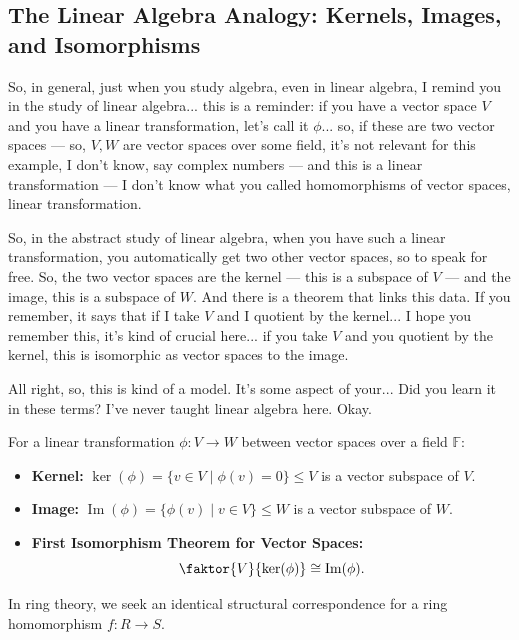 \subsection{The Linear Algebra Analogy: Kernels, Images, and Isomorphisms}

\begin{speech}[00:18:33 - 00:20:12]
So, in general, just when you study algebra, even in linear algebra, I remind you in the study of linear algebra...  this is a reminder: if you have a vector space $V$ and you have a linear transformation, let's call it $\phi$...  so, if these are two vector spaces --- so, $V, W$ are vector spaces over some field,  it's not relevant for this example, I don't know, say complex numbers --- and this is a linear transformation --- I don't know what you called homomorphisms of vector spaces, linear transformation. 

So, in the abstract study of linear algebra, when you have such a linear transformation, you automatically get two other vector spaces, so to speak for free. So, the two vector spaces are the kernel --- this is a subspace of $V$ --- and the image, this is a subspace of $W$.  And there is a theorem that links this data. If you remember, it says that if I take $V$ and I quotient by the kernel... I hope you remember this, it's kind of crucial here... if you take $V$ and you quotient by the kernel, this is isomorphic as vector spaces to the image. 

All right, so, this is kind of a model. It's some aspect of your... Did you learn it in these terms? I've never taught linear algebra here. Okay.
\end{speech}

\begin{overview}
For a linear transformation $\phi \colon V \to W$ between vector spaces over a field $\mathbb{F}$:
\begin{itemize}
    \item \textbf{Kernel:} $\ker(\phi) = \{ v \in V \mid \phi(v) = 0 \} \le V$ is a vector subspace of $V$.
    \item \textbf{Image:} $\operatorname{Im}(\phi) = \{ \phi(v) \mid v \in V \} \le W$ is a vector subspace of $W$.
    \item \textbf{First Isomorphism Theorem for Vector Spaces:}
    \[
    \faktor{V}{\ker(\phi)} \cong \operatorname{Im}(\phi).
    \]
\end{itemize}
In ring theory, we seek an identical structural correspondence for a ring homomorphism $f \colon R \to S$.
\end{overview}

